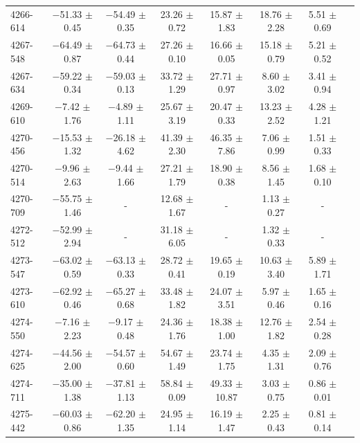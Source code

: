 \documentclass[a4paper,fleqn,usenatbib]{mnras}     %
\begin{document}
\begin{longtable}{l c c c c c c c }
4266-614   &   $-$51.33 $\pm$ 0.45   &   $-$54.49 $\pm$ 0.35   &    23.26 $\pm$ 0.72   &  15.87 $\pm$ 1.83   &  18.76 $\pm$ 2.28   &   5.51 $\pm$ 0.69  \\
4267-548   &   $-$64.49 $\pm$ 0.87   &   $-$64.73 $\pm$ 0.44   &    27.26 $\pm$ 0.10   &  16.66 $\pm$ 0.05   &  15.18 $\pm$ 0.79   &   5.21 $\pm$ 0.52  \\
4267-634   &   $-$59.22 $\pm$ 0.34   &   $-$59.03 $\pm$ 0.13   &    33.72 $\pm$ 1.29   &  27.71 $\pm$ 0.97   &   8.60 $\pm$ 3.02   &   3.41 $\pm$ 0.94  \\
4269-610   &    $-$7.42 $\pm$ 1.76   &    $-$4.89 $\pm$ 1.11   &    25.67 $\pm$ 3.19   &  20.47 $\pm$ 0.33   &  13.23 $\pm$ 2.52   &   4.28 $\pm$ 1.21  \\
4270-456   &   $-$15.53 $\pm$ 1.32   &   $-$26.18 $\pm$ 4.62   &    41.39 $\pm$ 2.30   &  46.35 $\pm$ 7.86   &   7.06 $\pm$ 0.99   &   1.51 $\pm$ 0.33  \\
4270-514   &    $-$9.96 $\pm$ 2.63   &    $-$9.44 $\pm$ 1.66   &    27.21 $\pm$ 1.79   &  18.90 $\pm$ 0.38   &   8.56 $\pm$ 1.45   &   1.68 $\pm$ 0.10  \\
4270-709   &   $-$55.75 $\pm$ 1.46   &     -   &    12.68 $\pm$ 1.67   &   -   &   1.13 $\pm$ 0.27   &   -  \\
4272-512   &   $-$52.99 $\pm$ 2.94   &     -   &    31.18 $\pm$ 6.05   &   -   &   1.32 $\pm$ 0.33   &   -  \\
4273-547   &   $-$63.02 $\pm$ 0.59   &   $-$63.13 $\pm$ 0.33   &    28.72 $\pm$ 0.41   &  19.65 $\pm$ 0.19   &  10.63 $\pm$ 3.40   &   5.89 $\pm$ 1.71  \\
4273-610   &   $-$62.92 $\pm$ 0.46   &   $-$65.27 $\pm$ 0.68   &    33.48 $\pm$ 1.82   &  24.07 $\pm$ 3.51   &   5.97 $\pm$ 0.46   &   1.65 $\pm$ 0.16  \\
4274-550   &    $-$7.16 $\pm$ 2.23   &    $-$9.17 $\pm$ 0.48   &    24.36 $\pm$ 1.76   &  18.38 $\pm$ 1.00   &  12.76 $\pm$ 1.82   &   2.54 $\pm$ 0.28  \\
4274-625   &   $-$44.56 $\pm$ 2.00   &   $-$54.57 $\pm$ 0.60   &    54.67 $\pm$ 1.49   &  23.74 $\pm$ 1.75   &   4.35 $\pm$ 1.31   &   2.09 $\pm$ 0.76  \\
4274-711   &   $-$35.00 $\pm$ 1.38   &   $-$37.81 $\pm$ 1.13   &    58.84 $\pm$ 0.09   &  49.33 $\pm$10.87   &   3.03 $\pm$ 0.75   &   0.86 $\pm$ 0.01  \\
4275-442   &   $-$60.03 $\pm$ 0.86   &   $-$62.20 $\pm$ 1.35   &    24.95 $\pm$ 1.14   &  16.19 $\pm$ 1.47   &   2.25 $\pm$ 0.43   &   0.81 $\pm$ 0.14  \\

\end{longtable}
\end{document}
